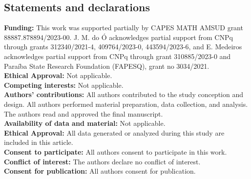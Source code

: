 \documentclass[12pt,reqno]{amsart}
\begin{document}
\bigskip


\subsection*{Statements and declarations}


\begin{flushleft}
	{\bf Funding:}  This work was supported partially by CAPES MATH AMSUD grant 88887.878894/2023-00.
	J. M. do \'O acknowledges partial support from CNPq through grants 312340/2021-4, 409764/2023-0, 443594/2023-6,  and E. Medeiros acknowledges partial support from CNPq through grant 310885/2023-0
	and Para\'iba State Research Foundation (FAPESQ), grant no 3034/2021.  \\
	{\bf Ethical Approval:}  Not applicable.\\
	{\bf Competing interests:}  Not applicable. \\
	{\bf Authors' contributions:}    All authors contributed to the study conception and design. All authors performed material preparation, data collection, and analysis. The authors read and approved the final manuscript.\\
	{\bf Availability of data and material:}  Not applicable.\\
	{\bf Ethical Approval:}  All data generated or analyzed during this study are included in this article.\\
	{\bf Consent to participate:}  All authors consent to participate in this work.\\
	{\bf Conflict of interest:} The authors declare no conflict of interest. \\
	{\bf Consent for publication:}  All authors consent for publication. \\
\end{flushleft}


\bigskip
	
\end{document}
